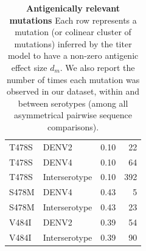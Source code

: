 \documentclass[11pt,oneside,letterpaper]{article}
\begin{document}
\begin{centering}
\begin{table}[ht]
{\begin{tabular}{llrr}
                           T478S &          DENV2 &  0.10 &     22 \\
                           T478S &          DENV4 &  0.10 &     64 \\
                           T478S &  Interserotype &  0.10 &    392 \\
                           S478M &          DENV4 &  0.43 &      5 \\
                           S478M &  Interserotype &  0.43 &     23 \\
                           V484I &          DENV2 &  0.39 &     54 \\
                           V484I &  Interserotype &  0.39 &     90 \\
\end{tabular}
\label{antigenic_mutations}
\caption{
\textbf{Antigenically relevant mutations}
Each row represents a mutation (or colinear cluster of mutations) inferred by the titer model to have a non-zero antigenic effect size $d_m$.
We also report the number of times each mutation was observed in our dataset, within and between serotypes (among all asymmetrical pairwise sequence comparisons).}
}
\end{table}
\end{centering}
\end{document}

